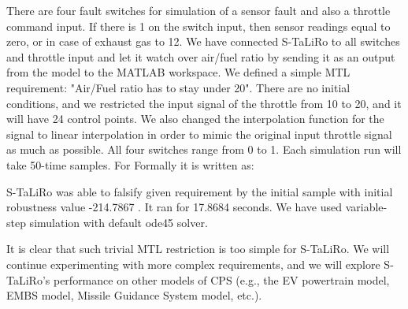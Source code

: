 There are four fault switches for simulation of a sensor fault and also a throttle command input. If there is 1 on the switch input, then sensor readings equal to zero, or in case of exhaust gas to 12. We have connected S-TaLiRo to all switches and throttle input and let it watch over air/fuel ratio by sending it as an output from the model to the MATLAB workspace. We defined a simple MTL requirement: "Air/Fuel ratio has to stay under 20". There are no initial conditions, and we restricted the input signal of the throttle from 10 to 20, and it will have 24 control points. We also changed the interpolation function for the signal to linear interpolation in order to mimic the original input throttle signal as much as possible. All four switches range from 0 to 1. Each simulation run will take 50-time samples. For Formally it is written as:



S-TaLiRo was able to falsify given requirement by the initial sample with initial robustness value -214.7867 \cite{Fainekos:RobustnessFinite}. It ran for 17.8684 seconds. We have used variable-step simulation with default ode45 solver.

It is clear that such trivial MTL restriction is too simple for S-TaLiRo. We will continue experimenting with more complex requirements, and we will explore S-TaLiRo's performance on other models of CPS (e.g., the EV powertrain model, EMBS model, Missile Guidance System model, etc.).
 
